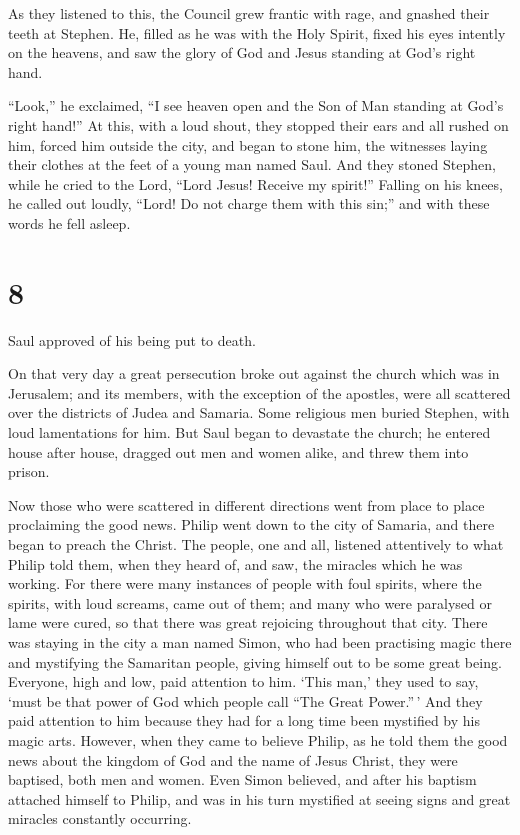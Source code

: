  As they listened to this, the Council grew frantic with
rage, and gnashed their teeth at Stephen.  He, filled as he
was with the Holy Spirit, fixed his eyes intently on the heavens, and
saw the glory of God and Jesus standing at God's right hand.

 ``Look,'' he exclaimed, ``I see heaven open and the Son of
Man standing at God's right hand!''  At this, with a loud
shout, they stopped their ears and all rushed on him, forced him outside
the city,  and began to stone him, the witnesses laying
their clothes at the feet of a young man named Saul.  And
they stoned Stephen, while he cried to the Lord, ``Lord Jesus! Receive
my spirit!''  Falling on his knees, he called out loudly,
``Lord! Do not charge them with this sin;'' and with these words he fell
asleep.

\hypertarget{section-7}{%
\section{8}\label{section-7}}

 Saul approved of his being put to death.

On that very day a great persecution broke out against the church which
was in Jerusalem; and its members, with the exception of the apostles,
were all scattered over the districts of Judea and Samaria. 
Some religious men buried Stephen, with loud lamentations for him.
 But Saul began to devastate the church; he entered house
after house, dragged out men and women alike, and threw them into
prison.

 Now those who were scattered in different directions went
from place to place proclaiming the good news.  Philip went
down to the city of Samaria, and there began to preach the Christ.
 The people, one and all, listened attentively to what
Philip told them, when they heard of, and saw, the miracles which he was
working.  For there were many instances of people with foul
spirits, where the spirits, with loud screams, came out of them;
 and many who were paralysed or lame were cured, so that
there was great rejoicing throughout that city.  There was
staying in the city a man named Simon, who had been practising magic
there and mystifying the Samaritan people, giving himself out to be some
great being.  Everyone, high and low, paid attention to
him. `This man,' they used to say, `must be that power of God which
people call ``The Great Power.''\,'  And they paid
attention to him because they had for a long time been mystified by his
magic arts.  However, when they came to believe Philip, as
he told them the good news about the kingdom of God and the name of
Jesus Christ, they were baptised, both men and women.  Even
Simon believed, and after his baptism attached himself to Philip, and
was in his turn mystified at seeing signs and great miracles constantly
occurring.

